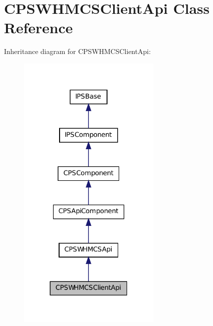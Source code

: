 \hypertarget{classCPSWHMCSClientApi}{
\section{CPSWHMCSClientApi Class Reference}
\label{classCPSWHMCSClientApi}
}


Inheritance diagram for CPSWHMCSClientApi:\nopagebreak
\begin{figure}[H]
\begin{center}
\leavevmode
\includegraphics[width=196pt]{classCPSWHMCSClientApi__inherit__graph}
\end{center}
\end{figure}


